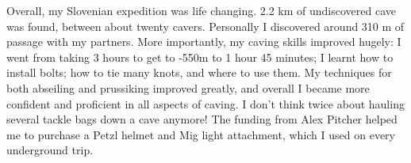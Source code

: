Overall, my Slovenian expedition was life changing. 2.2 km of undiscovered cave was found, between about twenty cavers. Personally I discovered around 310 m of passage with my partners. More
importantly, my caving skills improved hugely: I went from taking 3 hours to get to -550m to 1 hour
45 minutes; I learnt how to install bolts; how to tie many knots, and where to use them. My techniques
for both abseiling and prussiking improved greatly, and overall I became more confident and proficient
in all aspects of caving. I don't think twice about hauling several tackle bags down a cave anymore!
The funding from Alex Pitcher helped me to purchase a Petzl helmet and Mig light attachment, which I used on every underground trip.

